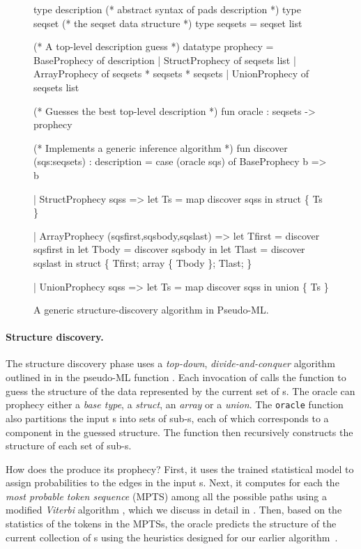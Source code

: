\begin{figure}[t]
\begin{centercode}
type description  (* abstract syntax of pads description *)
type seqset       (* the seqset data structure *)
type seqsets = seqset list

(* A top-level description guess *)
datatype prophecy =
   BaseProphecy   of description
 | StructProphecy of seqsets list 
 | ArrayProphecy  of seqsets * seqsets * seqsets
 | UnionProphecy  of seqsets list

(* Guesses the best top-level description *)
fun oracle : seqsets -> prophecy

(* Implements a generic inference algorithm *)
fun discover (sqs:seqsets) : description =
 case (oracle sqs) of
   BaseProphecy b => b

 | StructProphecy sqss => 
     let Ts = map discover sqss in
     struct \{ Ts \}

 | ArrayProphecy (sqsfirst,sqsbody,sqslast) => 
     let Tfirst = discover sqsfirst in
     let Tbody  = discover sqsbody  in
     let Tlast  = discover sqslast  in
     struct \{ Tfirst; array \{ Tbody \}; Tlast; \}

 | UnionProphecy sqss => 
     let Ts = map discover sqss in
     union \{ Ts \}
\end{centercode}
\caption{A generic structure-discovery algorithm in Pseudo-ML.} 
\label{fig:structure-discovery}
\end{figure}

\paragraph*{Structure discovery.}
The structure discovery phase uses a {\em top-down}, {\em
divide-and-conquer} algorithm outlined in 
 in the pseudo-ML function
.  Each invocation of 
calls the  function to guess the structure of the data represented
by the current set of \seqset{}s.  The oracle can prophecy
either a {\em base type}, a {\em struct}, an {\em array} or a {\em union}.
The {\tt oracle} function also partitions the input \seqset{}s into
sets of sub-\seqset{}s, each of which corresponds to a component in
the guessed structure.  The  function then recursively 
constructs the structure of each set of sub-\seqset{}s.

How does the  produce its prophecy?
First, it uses the trained statistical model to assign probabilities
to the edges in the input \seqset{}s.
Next, it computes for each \seqset{} the {\em most probable token
sequence} (MPTS) among all the possible paths 
using a modified {\em Viterbi} algorithm \cite{rabiner89:hmm},
which we discuss in detail in .
Then, based on the statistics of the tokens in the MPTSs,
the oracle predicts the structure of the current collection of
\seqset{}s using the heuristics designed for our earlier
algorithm~\cite{fisher+:dirttoshovels}. 

